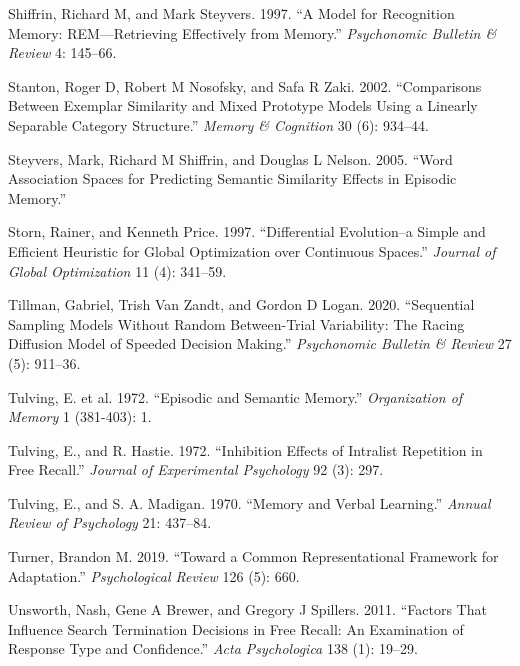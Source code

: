 \documentclass[
  letterpaper,
  11pt,
  english,
  singlespacing,
  headsepline]{MastersDoctoralThesis}
\newlength{\cslhangindent}
\newenvironment{CSLReferences}[2] %
 {\begin{list}{}{%
  \setlength{\itemindent}{0pt}
  \setlength{\leftmargin}{0pt}
  \setlength{\parsep}{0pt}
  \ifodd #1
   \setlength{\leftmargin}{\cslhangindent}
   \setlength{\itemindent}{-1\cslhangindent}
  \fi
  \setlength{\itemsep}{#2\baselineskip}}}
 {\end{list}}
\begin{document}
\begin{CSLReferences}{1}{0}
Shiffrin, Richard M, and Mark Steyvers. 1997. {``A Model for Recognition
Memory: REM---Retrieving Effectively from Memory.''} \emph{Psychonomic
Bulletin \& Review} 4: 145--66.

Stanton, Roger D, Robert M Nosofsky, and Safa R Zaki. 2002.
{``Comparisons Between Exemplar Similarity and Mixed Prototype Models
Using a Linearly Separable Category Structure.''} \emph{Memory \&
Cognition} 30 (6): 934--44.

Steyvers, Mark, Richard M Shiffrin, and Douglas L Nelson. 2005. {``Word
Association Spaces for Predicting Semantic Similarity Effects in
Episodic Memory.''}

Storn, Rainer, and Kenneth Price. 1997. {``Differential Evolution--a
Simple and Efficient Heuristic for Global Optimization over Continuous
Spaces.''} \emph{Journal of Global Optimization} 11 (4): 341--59.

Tillman, Gabriel, Trish Van Zandt, and Gordon D Logan. 2020.
{``Sequential Sampling Models Without Random Between-Trial Variability:
The Racing Diffusion Model of Speeded Decision Making.''}
\emph{Psychonomic Bulletin \& Review} 27 (5): 911--36.

Tulving, E. et al. 1972. {``Episodic and Semantic Memory.''}
\emph{Organization of Memory} 1 (381-403): 1.

Tulving, E., and R. Hastie. 1972. {``Inhibition Effects of Intralist
Repetition in Free Recall.''} \emph{Journal of Experimental Psychology}
92 (3): 297.

Tulving, E., and S. A. Madigan. 1970. {``Memory and Verbal Learning.''}
\emph{Annual Review of Psychology} 21: 437--84.

Turner, Brandon M. 2019. {``Toward a Common Representational Framework
for Adaptation.''} \emph{Psychological Review} 126 (5): 660.

Unsworth, Nash, Gene A Brewer, and Gregory J Spillers. 2011. {``Factors
That Influence Search Termination Decisions in Free Recall: An
Examination of Response Type and Confidence.''} \emph{Acta Psychologica}
138 (1): 19--29.


\end{CSLReferences}
\end{document}
